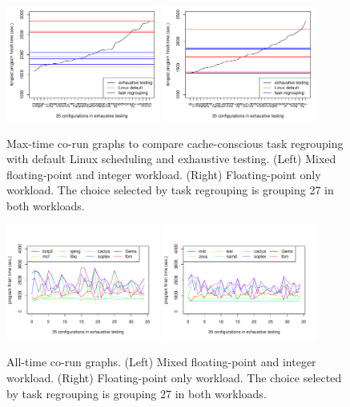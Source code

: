 \begin{figure}[h]
\centering
\includegraphics[width=0.45\textwidth]{figures/regroup/mix_max.pdf}
\includegraphics[width=0.45\textwidth]{figures/regroup/fp_max.pdf}
\caption{Max-time co-run graphs to compare cache-conscious task
  regrouping with default Linux scheduling and exhaustive
  testing. (Left) Mixed floating-point and integer workload.  (Right)
  Floating-point only workload.  The choice selected by task
  regrouping is grouping 27 in both workloads. }
\label{fig:max}
\end{figure}

\newlength{\height}
\setlength{\height}{8.5cm}
\begin{figure}[h]
\centering
\includegraphics[width=0.45\textwidth,height=\height]{figures/regroup/mix_static.pdf}
\includegraphics[width=0.45\textwidth,height=\height]{figures/regroup/fp_static.pdf}
\caption{All-time co-run graphs.  (Left) Mixed floating-point and
  integer workload.  (Right) Floating-point only workload.  The choice selected by task
  regrouping is grouping 27 in both workloads.  }
\label{fig:all}
\end{figure}

